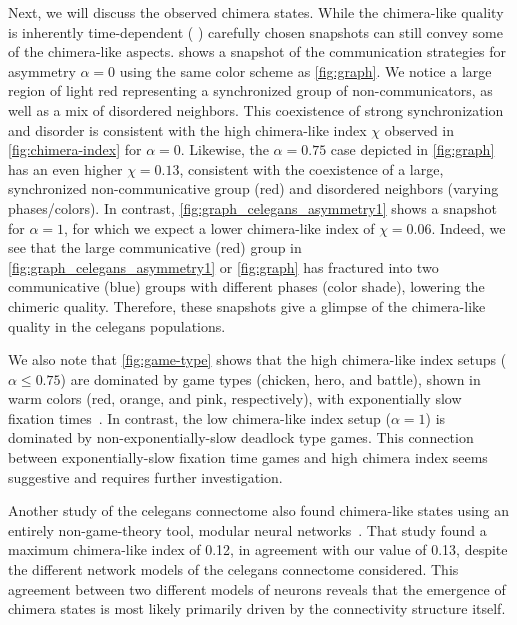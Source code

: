 \documentclass[pdflatex,lineno,referee,sn-nature]{sn-jnl}
\begin{document}
Next, we will discuss the observed chimera states.
While the chimera-like quality is inherently time-dependent
(\cf{} )
carefully chosen snapshots can still convey some of the chimera-like aspects.
 shows a snapshot of the communication strategies
for asymmetry $\alpha = 0$ using the same color scheme as \cref{fig:graph}.
We notice a large region of light red representing
a synchronized group of non-communicators,
as well as a mix of disordered neighbors.
This coexistence of strong synchronization and disorder
is consistent with the high
chimera-like index $\chi$ observed in \cref{fig:chimera-index} for $\alpha = 0$.
Likewise, the $\alpha = 0.75$ case depicted in \cref{fig:graph}
has an even higher $\chi = \num{0.13}$,
consistent with the coexistence of a large,
synchronized non-communicative group (red)
and disordered neighbors (varying phases/colors).
In contrast,
\cref{fig:graph_celegans_asymmetry1} shows a snapshot for $\alpha = 1$,
for which we expect a lower chimera-like index of $\chi = \num{0.06}$.
Indeed, we see that the large communicative (red) group
in \cref{fig:graph_celegans_asymmetry1}
or \cref{fig:graph} has fractured into two
communicative (blue) groups with different phases (color shade),
lowering the chimeric quality.
Therefore, these snapshots give a glimpse of the chimera-like quality
in the \gls{celegans} populations.

We also note that \cref{fig:game-type} shows that
the high chimera-like index setups ($\alpha \le 0.75$)
are dominated by game types (chicken, hero, and battle),
shown in warm colors (red, orange, and pink, respectively),
with exponentially slow fixation times~\citep{antal2006fixation}.
In contrast, the low chimera-like index setup ($\alpha = 1$)
is dominated by non-exponentially-slow deadlock type games.
This connection between exponentially-slow fixation time games and high chimera index
seems suggestive and requires further investigation.

Another study of the \gls{celegans} connectome also found
chimera-like states using an entirely non-game-theory tool,
modular neural networks~\citep{hizanidis2016chimera}.
That study found a maximum chimera-like index of \num{0.12},
in agreement with our value of \num{0.13}, despite the different network models
of the \gls{celegans} connectome considered.
This agreement between two different models of neurons
reveals that the emergence of chimera states
is most likely primarily driven by the connectivity structure itself.
\end{document}

